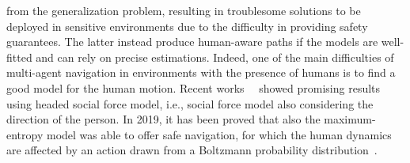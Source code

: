 from the generalization problem, resulting in troublesome solutions to be
deployed in sensitive environments due to the difficulty in providing safety
guarantees. The latter instead produce human-aware paths if the models are
well-fitted and can rely on precise estimations. Indeed, one of the main
difficulties of multi-agent navigation in environments with the presence of
humans is to find a good model for the human motion. Recent
works~\cite{bevilacqua2018}~\cite{conflict_detection} showed promising results
using headed social force model, i.e., social force model also considering the
direction of the person. In 2019, it has been proved that also the
maximum-entropy model was able to offer safe navigation, for which the human
dynamics are affected by an action drawn from a Boltzmann probability
distribution~\cite{bajcsy2019}.

